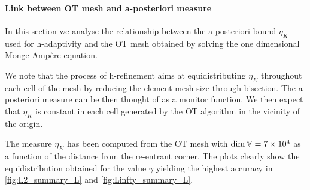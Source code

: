 \documentclass[a4paper,11pt]{article}
\begin{document}
{\clearpage
\newpage


\paragraph{Link between OT mesh and a-posteriori measure}

In this section we analyse the relationship between the a-posteriori bound $\eta_{K}$ used for h-adaptivity and the OT mesh obtained by solving the one dimensional Monge-Ampère equation.

We note that the process of h-refinement aims at equidistributing $\eta_{K}$ throughout each cell of the mesh by reducing the element mesh size through bisection. The a-posteriori measure can be then thought of as a monitor function. We then expect that $\eta_{K}$ is constant in each cell generated by the OT algorithm in the vicinity of the origin.

The measure $\eta_{K}$ has been computed from the OT mesh with $\dim \mathbb V = 7 \times 10^{4}$ as a function of the distance from the re-entrant corner. The plots clearly show the equidistribution obtained for the value $\gamma$ yielding the highest accuracy in \ref{fig:L2_summary_L} and \ref{fig:Linfty_summary_L}.
 

}
\end{document}
